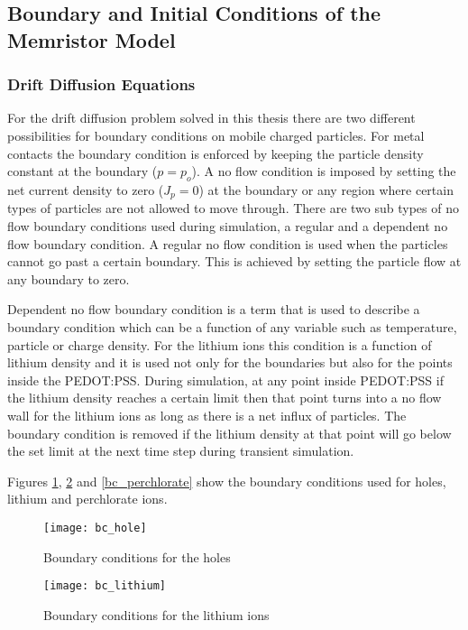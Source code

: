 \begin{doublespace}
\subsection{Boundary and Initial Conditions of the Memristor Model}

\subsubsection{Drift Diffusion Equations}

For the drift diffusion problem solved in this thesis there are two different possibilities for boundary conditions on mobile charged particles. For metal contacts the boundary condition is enforced by keeping the particle density constant at the boundary ($p = p_o$). A no flow condition is imposed by setting the net current density to zero ($J_p = 0 $) at the boundary or any region where certain types of particles are not allowed to move through. There are two sub types of no flow boundary conditions used during simulation, a regular and a dependent no flow boundary condition. A regular no flow condition is used when the particles cannot go past a certain boundary. This is achieved by setting the particle flow at any boundary to zero. 

Dependent no flow boundary condition is a term that is used to describe a boundary condition which can be a function of any variable such as temperature, particle or charge density. For the lithium ions this condition is a function of lithium density and it is used not only for the boundaries but also for the points inside the PEDOT:PSS. During simulation, at any point inside PEDOT:PSS if the lithium density reaches a certain limit then that point turns into a no flow wall for the lithium ions as long as there is a net influx of particles. The boundary condition is removed if the lithium density at that point will go below the set limit at the next time step during transient simulation.  

Figures \ref{bc_hole}, \ref{bc_lithium} and \ref{bc_perchlorate} show the boundary conditions used for holes, lithium and perchlorate ions.

\begin{figure}[!htp]
\centering
\texttt{[image: bc\_hole]}
\caption{Boundary conditions for the holes } 
\label{bc_hole}
\end{figure}

\begin{figure}[!htp]
\centering
\texttt{[image: bc\_lithium]}
\caption{Boundary conditions for the lithium ions } 
\label{bc_lithium}
\end{figure}


\end{doublespace}

